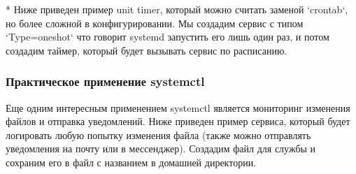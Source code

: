 \documentclass[letterpaper,10pt,russian]{sphinxmanual}
\begin{document}
\begin{sphinxVerbatim}[commandchars=\\\{\}]
* Ниже приведен пример unit timer, который можно считать заменой `crontab`, но более сложной в конфигурировании. Мы создадим сервис с типом `Type=oneshot` что говорит systemd запустить его лишь один раз, и потом создадим таймер, который будет вызывать сервис по расписанию.
\end{sphinxVerbatim}

\begin{sphinxVerbatim}[commandchars=\\\{\}]
            \PYG{p}{[}\PYG{p}{]}
             
            
            \PYG{p}{[}\PYG{p}{]}
            
            \PYG{p}{[}\PYG{p}{]}
               
            
            \PYG{p}{[}\PYG{p}{]}
             
            
            \PYG{p}{[}\PYG{p}{]}
\end{sphinxVerbatim}


\subsubsection{Практическое применение systemctl}
\label{\detokenize{educational_materials/managers/content:id4}}
\sphinxAtStartPar
Еще одним интересным применением systemctl является мониторинг изменения файлов и отправка уведомлений. Ниже приведен пример сервиса, который будет логировать любую попытку изменения файла (также можно отправлять уведомления на почту или в мессенджер). Создадим файл для службы и сохраним его в файл с названием  в домашней директории.
\end{document}
